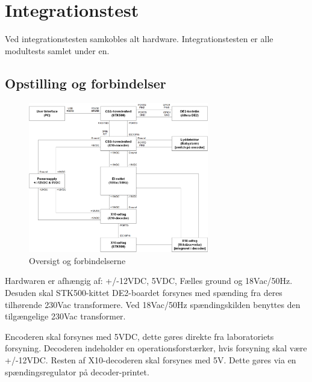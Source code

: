 \section{Integrationstest}
Ved integrationstesten samkobles alt hardware. Integrationstesten er alle modultests samlet under en. 

\subsection{Opstilling og forbindelser}

\begin{figure}[H]
	\centering
	\includegraphics[width=0.7\textwidth]{billeder/IntTest/Integration_oversigt}
	\caption{Oversigt og forbindelserne}
	\label{fig:integration_oversigt}
\end{figure}

Hardwaren er afhængig af: +/-12VDC, 5VDC, Fælles ground og 18Vac/50Hz. Desuden skal STK500-kittet DE2-boardet forsynes med spænding fra deres tilhørende 230Vac transformere. Ved 18Vac/50Hz spændingskilden benyttes den tilgængelige 230Vac transformer. 

Encoderen skal forsynes med 5VDC, dette gøres direkte fra laboratoriets forsyning.
Decoderen indeholder en operationsforstærker, hvis forsyning skal være +/-12VDC. Resten af X10-decoderen skal forsynes med 5V. Dette gøres via en spændingsregulator på decoder-printet.   

